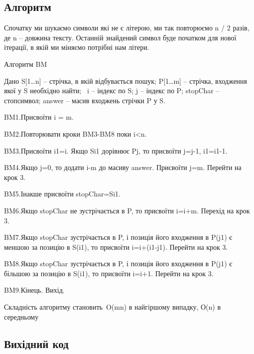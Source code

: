 \documentclass[12pt]{extarticle}
\begin{document}
\subsection*{Алгоритм}

Спочатку ми шукаємо символи які не є літерою, ми так повторюємо n / 2
разів, де n -- довжина тексту. Останній знайдений символ буде початком для
нової ітерації, в якій ми міняємо потрібні нам літери.

Алгоритм BM

Дано S[1…n] – стрічка, в якій відбувається пошук; P[1…m] – стрічка, входження якої у S необхідно найти;  i – індекс по S; j – індекс по P; stopChar – стопсимвол; answer – масив входжень стрічки P у S.

BM1.Присвоїти i = m. 

BM2.Повторювати кроки BM3-BM8 поки i<n.

BM3.Присвоїти i1=i. Якщо Si1 дорівнює Pj, то присвоїти j=j-1, i1=i1-1. 

BM4.Якщо j=0, то додати i-m до масиву answer. Присвоїти j=m. Перейти на крок 3.

BM5.Інакше присвоїти stopChar=Si1.

BM6.Якщо stopChar не зустрічається в P, то присвоїти i=i+m. Перехід на крок 3.

BM7.Якщо stopChar зустрічається в P, і позиція його входження в P(j1) є меншою за позицію в S(i1), то присвоїти i=i+(i1-j1). Перейти на крок 3.

BM8.Якщо stopChar зустрічається в P, і позиція його входження в P(j1) є більшою за позицію в S(i1), то присвоїти i=i+1. Перейти на крок 3.

BM9.Кінець. Вихід.

Складність алгоритму становить O(mn) в найгіршому випадку, О(n) в середньому
\subsection*{Вихідний код}
\end{document}

